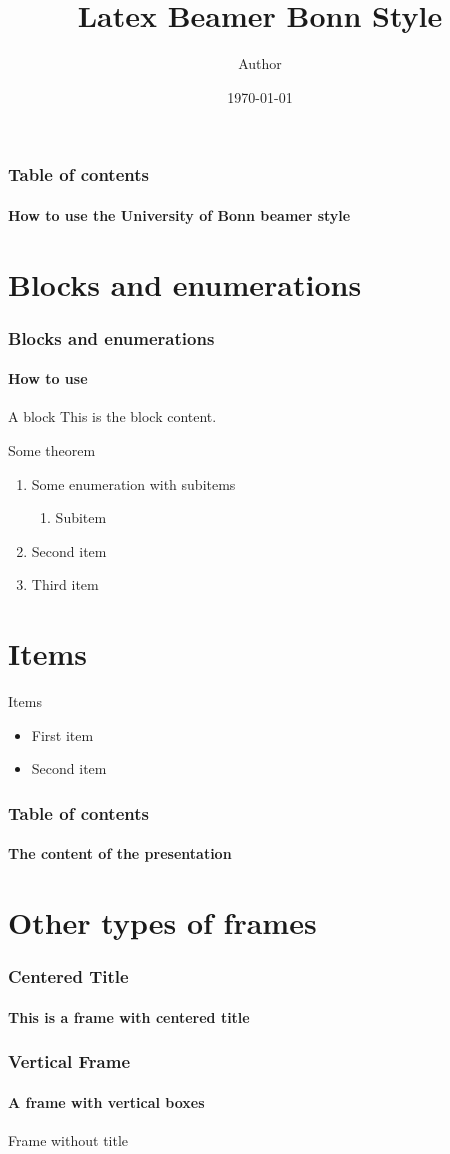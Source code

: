 \documentclass[aspectratio=1610]{beamer}
\title{Latex Beamer Bonn Style}
\date{\today}
\author{Author}
\begin{document}
	\begin{frame}[plain]
	\titlepage
\end{frame}

\begin{framecontent}
	\frametitle{Table of contents}
	\framesubtitle{How to use the University of Bonn beamer style} 
\end{framecontent}



\section{Blocks and enumerations}
\begin{frame} 
\frametitle{Blocks and enumerations} 
\framesubtitle{How to use} 
\begin{block}{A block}
	This is the block content.
\end{block}
\begin{theorem}
	Some theorem \end{theorem} 
\begin{enumerate}
	\item<1-| alert@1> Some enumeration with subitems 
	\begin{enumerate}
		\item Subitem
	\end{enumerate}
	\item<2-> Second item
	\item<3-> Third item
\end{enumerate}
\end{frame}

\section{Items}
\begin{frame}{Items}
\begin{itemize}
\item First item
\item Second item
\end{itemize}
\end{frame}

\begin{frameverticalcontent}
	\frametitle{Table of contents}
	\framesubtitle{The content of the presentation} 
\end{frameverticalcontent}

\section{Other types of frames}

\begin{framecenter}
	\frametitle{Centered Title}
	\framesubtitle{This is a frame with centered title} 
\end{framecenter}

\begin{framevertical}
	\frametitle{Vertical Frame}
	\framesubtitle{A frame with vertical boxes} 
\end{framevertical}





\begin{frameblank}
	Frame without title
\end{frameblank}
\end{document}
